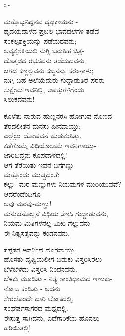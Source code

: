 \begin{center}
೩-
\end{center}

\begin{myquote}
ಮತ್ತೊಬ್ಬನಿದ್ದನವ ದೃಢಕಾಯನು -\\ಹೃದಯದಾಳದ ಪ್ರಬಲ ಭಾವದಲೆಗಳ ತಡೆವ\\ಸಂಕಲ್ಪಶಕ್ತಿಯನ್ನು ಪಡೆಯದವನು;\\ಅವ್ಯಕ್ತಶಕ್ತಿಯಲಿ ನುಗ್ಗಿ ಬರುತಿಹ ಚಿತ್ರ-\\ದೊತ್ತಡದ ರಭಸವನು ತಡೆಯದವನು.\\ಜಗದ ಕಣ್ಣಲ್ಲಿವನು ಸಜ್ಜನನು, ಕರುಣಾಳು;\\ನುಗ್ಗಿ ಬಹ ಅಲೆಯೆದುರು ಗುದ್ದಾಡುತಿರೆ ಪರರು\\ಸುಕ್ಷೇಮ ಇವನಿಲ್ಲಿ, ಆಪತ್ತುಗಳಿಗೆಂದು\\ಸಿಲುಕದವನು!
\end{myquote}

\begin{myquote}
ಕೊಳೆತು ನಾರುವ ಹುಣ್ಣನರಸಿ ಹೋಗುವ ನೊಣದ\\ತೆರದಲೀತನ ಮನಸು ಹೀನವಾಯ್ತು;\\ಎಲ್ಲೆಲ್ಲು ದೋಷವನೆ ಹುಡುಕುತಿತ್ತು.\\ಕಡೆಗೊಮ್ಮೆ ವಿಧಿಯೊಲುಮೆ ಇವನಿಗಾಯ್ತು-\\ಜಾರಿಬಿದ್ದನು ಕೂಪದಾಳದಲ್ಲಿ!\\ಆಗ ತೆರೆಯಿತು ಇವನ ಬಗೆಗಣ್ಣು\\ಮತ್ತೊಂದು ಮುಚ್ಚದಂತೆ:\\ಕಲ್ಲು -ಮರ-ಮಣ್ಣುಗಳು ನಿಯಮಗಳ ಮುರಿಯುವವೆ?\\ಆದರೆಂದೆಂದಿಗೂ\\ಅವು ಮರವು-ಮಣ್ಣು!\\ಮನುಜನೊಬ್ಬನೆ ವಿಧಿಯ ಸೆಣಸಿ ಗುದ್ದಾಡುವನು,\\ನಿಯಮ-ಮಿತಿಗಳನೆಲ್ಲ ಮೀರಿ ಗೆಲ್ಲುವನು -\\ಈ ನಿತ್ಯಸತ್ಯವನ್ನು ಕಂಡನವನು.
\end{myquote}

\begin{myquote}
ಸಪ್ಪೆತನ ಅವನಿಂದ ದೂರವಾಯ್ತು;\\ಹೊಸತು ದೃಷ್ಟಿಯಲೀಗ ಬದುಕು ವಿಸ್ತರಿಸಿರಲು\\ಬೆಳೆಬೆಳೆದು ವಿಸ್ತರಿಸಿ ನಿಂದನವನು.\\ಬೆಳಕು ಮೂಡಿತು - ನಿತ್ಯ ಶಾಂತಿಧಾಮದ ಇಣುಕು-\\ನೋಟ ಕಂಡಿತು - ಅದನು\\ಸೇರಲೊಂದೇ ದಾರಿ ಲೋಕದಲ್ಲಿ,\\ಸಂಘರ್ಷಸಾಗರದ ಮಧ್ಯದಲ್ಲಿ.\\ಈಸುತ್ತ ಸಾಗಿದನು, ಎದೆಗಾರಿಕೆಯ ಹೊನಲು\\ಹರಿಯಿತಲ್ಲಿ!
\end{myquote}

